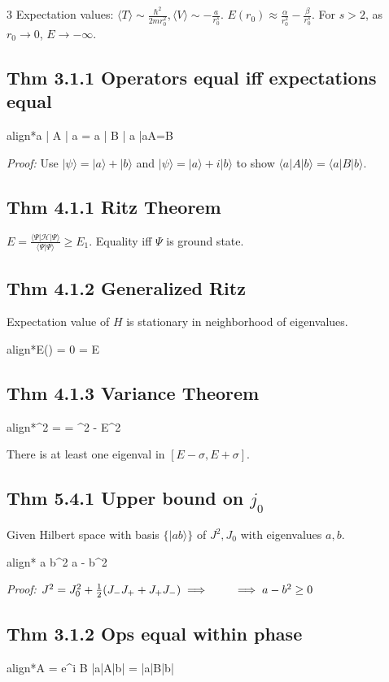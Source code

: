 \documentclass[10pt,a4paper]{article}
\newcommand{\important}[1]{\begin{empheq}[box=\fbox]{align*}#1\end{empheq}}
\begin{document}
\begin{multicols*}{3}
Expectation values: $\langle T \rangle \sim \frac{\hbar^2}{2mr_0^2}, \langle V \rangle \sim -\frac{a}{r_0^s}$.
$E(r_0) \approx \frac{\alpha}{r_0^2} - \frac{\beta}{r_0^s}$. For $s>2$, as $r_0 \to 0$, $E \to -\infty$.

\subsection*{Thm 3.1.1 Operators equal iff expectations equal}
\important{\langle a | A | a \rangle = \langle a | B | a \rangle \forall |a\rangle \iff A=B}
\textit{Proof:} Use $|\psi\rangle = |a\rangle + |b\rangle$ and $|\psi\rangle = |a\rangle + i|b\rangle$ to show $\langle a|A|b\rangle = \langle a|B|b\rangle$.

\subsection*{Thm 4.1.1 Ritz Theorem}
$E = \frac{\langle \Psi | \mathcal{H} | \Psi \rangle}{\langle \Psi | \Psi \rangle} \ge E_1$. Equality iff $\Psi$ is ground state.

\subsection*{Thm 4.1.2 Generalized Ritz}
Expectation value of $H$ is stationary in neighborhood of eigenvalues.
\important{\delta E(\Psi) = 0 \iff {}\Psi = E\Psi}

\subsection*{Thm 4.1.3 Variance Theorem}
\important{\sigma^2 = \frac{\langle \Psi | (-E)^2 | \Psi \rangle}{\langle \Psi | \Psi \rangle} = \langle \mathcal{H}^2 \rangle - E^2}
There is at least one eigenval in $[E-\sigma, E+\sigma]$.

\subsection*{Thm 5.4.1 Upper bound on $j_0$}
Given Hilbert space with basis $\{|ab\rangle\}$ of $J^2, J_0$ with eigenvalues $a,b$.
\important{ a \ge b^2 \implies a - b^2 }
\textit{Proof:}  $J^2 = J_0^2 + \frac{1}{2}(J_- J_+ + J_+ J_-) \implies \\  \quad \quad \implies a - b^2 \ge 0$

\subsection*{Thm 3.1.2 Ops equal within phase}
\important{A = e^{i\theta} B \iff |\langle a|A|b\rangle| = |\langle a|B|b\rangle|}


\end{multicols*}
\end{document}

